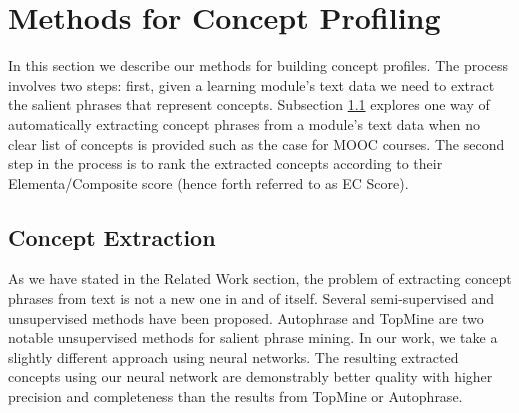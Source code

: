 \section{Methods for Concept Profiling}

In this section we describe our methods for building concept profiles. The process involves two steps: first, given a learning module's text data we need to extract the salient phrases that represent concepts. Subsection \ref{extraction} explores one way of automatically extracting concept phrases from a module's text data when no clear list of concepts is provided such as the case for MOOC courses. The second step in the process is to rank the extracted concepts according to their Elementa/Composite score (hence forth referred to as EC Score).

\subsection{Concept Extraction}\label{extraction}



As we have stated in the Related Work section, the problem of extracting concept phrases from text is not a new one in and of itself. Several semi-supervised and unsupervised methods have been proposed. Autophrase \cite{} and TopMine \cite{} are two notable unsupervised methods for salient phrase mining. In our work, we take a slightly different approach using neural networks. The resulting extracted concepts using our neural network are demonstrably better quality with higher precision and completeness than the results from TopMine or Autophrase. %


